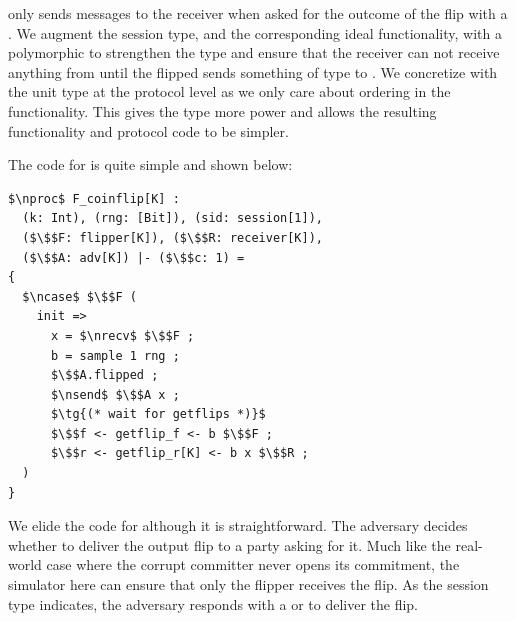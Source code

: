\Fflip only sends messages to the receiver when asked for the outcome of the flip with a . 
We augment the session type, and the corresponding ideal functionality, with a polymorphic  to strengthen the type and ensure that the receiver can not receive anything from  until the flipped sends something of type  to \Fflip.
We concretize  with the unit type \inline{()} at the protocol level as we only care about ordering in the functionality. 
This gives the type more power and allows the resulting functionality and protocol code to be simpler. 

The code for \Fflip is quite simple and shown below:
\begin{lstlisting}[basicstyle=\small\BeraMonottFamily, frame=single, mathescape]
$\nproc$ F_coinflip[K] :
  (k: Int), (rng: [Bit]), (sid: session[1]),
  ($\$$F: flipper[K]), ($\$$R: receiver[K]),
  ($\$$A: adv[K]) |- ($\$$c: 1) =
{
  $\ncase$ $\$$F (
    init =>
      x = $\nrecv$ $\$$F ;
      b = sample 1 rng ;
      $\$$A.flipped ;
      $\nsend$ $\$$A x ;
	  $\tg{(* wait for getflips *)}$
      $\$$f <- getflip_f <- b $\$$F ;
      $\$$r <- getflip_r[K] <- b x $\$$R ;
  )
}
\end{lstlisting}
We elide the code for  although it is straightforward. 
The adversary decides whether to deliver the output flip to a party asking for it.
Much like the real-world case where the corrupt committer never opens its commitment, the simulator here can ensure that only the flipper receives the flip.
As the session type indicates, the adversary responds with a  or  to deliver the flip.


